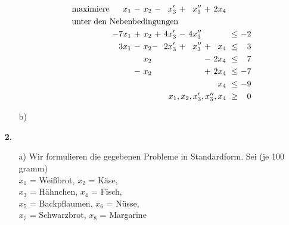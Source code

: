 \documentclass [a4paper,11pt]{article}
\begin{document}
\begin{enumerate}
\begin{enumerate}
\begin{enumerate}
                            \begin{align*}
                            \begin{alignedat}{7}
                            & \text{maximiere } & x_1 &\ - &\ x_2 &\ - &\ x_3' &\ + &\ x_3'' &\ + &\ 2x_4 & & \\
                            & \rlap{unter den Nebenbedingungen} & & & & & & & & & & & \\
                            &&-7x_1 &\ + &\ x_2 &\ + &\ 4x_3' &\ - &\ 4x_3'' &    &       &\ \leq &\  -2 \\
                            && 3x_1 &\ - &\ x_2 &  - &\ 2x_3' &\ + &\ x_3''  &\ + &\  x_4 &\ \leq &\  3 \\
                            &&      &    &\ x_2 &    &        &    &         &\ - &\ 2x_4 &\ \leq &\  7 \\
                            &&      &\ - &\ x_2 &    &        &    &         &\ + &\ 2x_4 &\ \leq &\  -7 \\
                            &&      &    &      &    &        &    &         &    &\ x_4  &\ \leq &\  -9 \\
                            &&      &    &      &    &        &    &         &    & \llap{$x_1, x_2, x_3', x_3'', x_4$} &\ \geq &\ 0
                            \end{alignedat}
                            \end{align*}
                    \end{enumerate}
                \item[b)]
            \end{enumerate}
        \item[\textbf{2.}]
        \begin{enumerate}
                \item[a)]
                    Wir formulieren die gegebenen Probleme in Standardform. Sei (je 100 gramm)\\
                    $x_1$ = Weißbrot, $x_2$ = Käse,\\
                    $x_3$ = Hähnchen, $x_4$ = Fisch,\\
                    $x_5$ = Backpflaumen, $x_6$ = Nüsse,\\
                    $x_7$ = Schwarzbrot, $x_8$ = Margarine\\


\end{enumerate}
\end{enumerate}
\end{document}
